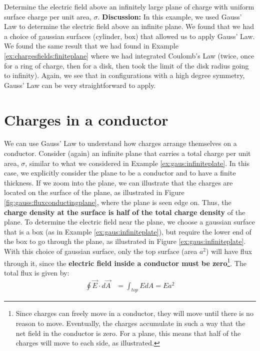 \begin{example}{Determine the electric field above an infinitely large plane of charge with uniform surface charge per unit area, $\sigma$.}
\textbf{Discussion: }In this example, we used Gauss' Law to determine the electric field above an infinite plane. We found that we had a choice of gaussian surfaces (cylinder, box) that allowed us to apply Gauss' Law. We found the same result that we had found in Example \ref{ex:chargesfields:finiteplane} where we had integrated Coulomb's Law (twice, once for a ring of charge, then for a disk, then took the limit of the disk radius going to infinity). Again, we see that in configurations with a high degree symmetry, Gauss' Law can be very straightforward to apply.
\end{example}

\section{Charges in a conductor}
\label{sec:gauss:conductors}
We can use Gauss' Law to understand how charges arrange themselves on a conductor. Consider (again) an infinite plane that carries a total charge per unit area, $\sigma$, similar to what we considered in Example \ref{ex:gaus:infiniteplate}. In this case, we explicitly consider the plane to be a conductor and to have a finite thickness. If we zoom into the plane, we can illustrate that the charges are located on the surface of the plane, as illustrated in Figure \ref{fig:gauss:fluxconductingplane}, where the plane is seen edge on. Thus, the \textbf{charge density at the surface is half of the total charge density} of the plane.
To determine the electric field near the plane, we choose a gaussian surface that is a box (as in Example \ref{ex:gaus:infiniteplate}), but require the lower end of the box to go through the plane, as illustrated in Figure \ref{ex:gaus:infiniteplate}. With this choice of gaussian surface, only the top surface (area $a^2$) will have flux through it, since the \textbf{electric field inside a conductor must be zero}\footnote{Since charges can freely move in a conductor, they will move until there is no reason to move. Eventually, the charges accumulate in such a way that the net field in the conductor is zero. For a plane, this means that half of the charges will move to each side, as illustrated.}. The total flux is given by:
\begin{align*}
\oint \vec E\cdot d\vec A&= \int_{top} EdA=Ea^2
\end{align*}
